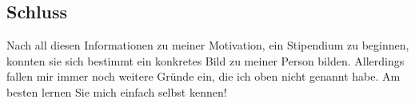 \documentclass{scrartcl}
\begin{document}
\subsection*{Schluss}
Nach all diesen Informationen zu meiner Motivation, ein Stipendium zu beginnen, konnten sie
sich bestimmt ein konkretes Bild zu meiner Person bilden. Allerdings fallen mir immer noch
weitere Gründe ein, die ich oben nicht genannt habe. Am besten lernen Sie mich einfach selbst kennen!
\end{document}
